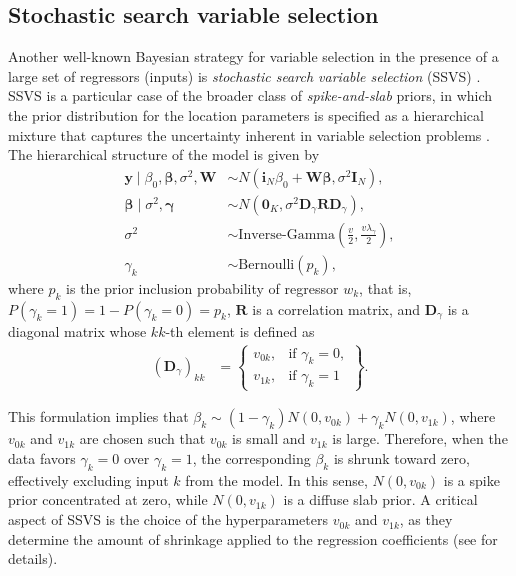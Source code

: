 \subsection{Stochastic search variable selection}\label{sec13_22}
Another well-known Bayesian strategy for variable selection in the presence of a large set of regressors (inputs) is \textit{stochastic search variable selection} (SSVS) \cite{george1993variable,George1997}. SSVS is a particular case of the broader class of \textit{spike-and-slab} priors, in which the prior distribution for the location parameters is specified as a hierarchical mixture that captures the uncertainty inherent in variable selection problems \cite{Ishwaran2005}. The hierarchical structure of the model is given by
\begin{align*}
	\mathbf{y} \mid \beta_0, \boldsymbol{\beta}, \sigma^2, \mathbf{W} &\sim {N}(\mathbf{i}_N \beta_0  + \mathbf{W} \boldsymbol{\beta}, \sigma^2 \mathbf{I}_N), \\
	\boldsymbol{\beta} \mid \sigma^2, \boldsymbol{\gamma} &\sim {N}(\mathbf{0}_K, \sigma^2 \mathbf{D}_{\gamma} \mathbf{R} \mathbf{D}_{\gamma}), \\
	\sigma^2 &\sim \text{Inverse-Gamma}\left(\frac{v}{2}, \frac{v\lambda_{\gamma}}{2}\right), \\
	\gamma_k &\sim \text{Bernoulli}(p_k),
\end{align*}
where \(p_k\) is the prior inclusion probability of regressor \(w_k\), that is, \(P(\gamma_k = 1) = 1 - P(\gamma_k = 0) = p_k\), \(\mathbf{R}\) is a correlation matrix, and \(\mathbf{D}_{\gamma}\) is a diagonal matrix whose \(kk\)-th element is defined as
\begin{align*}
	(\mathbf{D}_{\gamma})_{kk} &= 
	\begin{Bmatrix}
		v_{0k}, & \text{if } \gamma_k = 0, \\
		v_{1k}, & \text{if } \gamma_k = 1
	\end{Bmatrix}.
\end{align*}

This formulation implies that \(\beta_k \sim (1 - \gamma_k) {N}(0, v_{0k}) + \gamma_k {N}(0, v_{1k})\), where \(v_{0k}\) and \(v_{1k}\) are chosen such that \(v_{0k}\) is small and \(v_{1k}\) is large. Therefore, when the data favors \(\gamma_k = 0\) over \(\gamma_k = 1\), the corresponding \(\beta_k\) is shrunk toward zero, effectively excluding input \(k\) from the model. In this sense, \({N}(0, v_{0k})\) is a spike prior concentrated at zero, while \({N}(0, v_{1k})\) is a diffuse slab prior. A critical aspect of SSVS is the choice of the hyperparameters \(v_{0k}\) and \(v_{1k}\), as they determine the amount of shrinkage applied to the regression coefficients (see \cite{george1993variable,George1997} for details).

